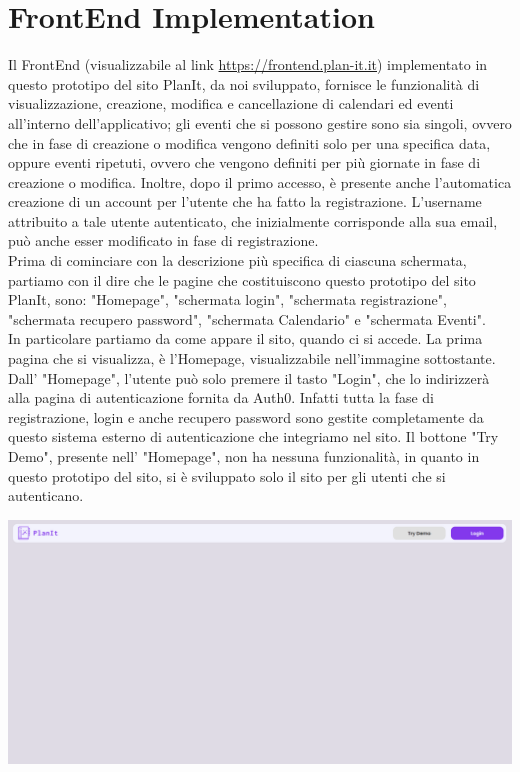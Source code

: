 \section{FrontEnd Implementation}
\label{secD4:FrontEndImplementation}
Il FrontEnd (visualizzabile al link \href{https://frontend.plan-it.it} {https://frontend.plan-it.it}) implementato in questo prototipo del sito PlanIt, da noi sviluppato, fornisce le funzionalità di visualizzazione, creazione, modifica e cancellazione di calendari ed eventi all'interno dell'applicativo; gli eventi che si possono gestire sono sia singoli, ovvero che in fase di creazione o modifica vengono definiti solo per una specifica data, oppure eventi ripetuti, ovvero che vengono definiti per più giornate in fase di creazione o modifica. Inoltre, dopo il primo accesso, è presente anche l'automatica creazione di un account per l'utente che ha fatto la registrazione. L'username attribuito a tale utente autenticato, che inizialmente corrisponde alla sua email, può anche esser modificato in fase di registrazione. \\ Prima di cominciare con la descrizione più specifica di ciascuna schermata, partiamo con il dire che le pagine che costituiscono questo prototipo del sito PlanIt, sono: "Homepage", "schermata login", "schermata registrazione", "schermata recupero password", "schermata Calendario" e "schermata Eventi".
\\ In particolare partiamo da come appare il sito, quando ci si accede. La prima pagina che si visualizza, è l'Homepage, visualizzabile nell'immagine sottostante. Dall' "Homepage", l'utente può solo premere il tasto "Login", che lo indirizzerà alla pagina di autenticazione fornita da Auth0. Infatti tutta la fase di registrazione, login e anche recupero password sono gestite completamente da questo sistema esterno di autenticazione che integriamo nel sito. Il bottone "Try Demo", presente nell' "Homepage", non ha nessuna funzionalità, in quanto in questo prototipo del sito, si è sviluppato solo il sito per gli utenti che si autenticano.
\begin{center}
    \includegraphics[width=1\textwidth, height=0.3\textheight]{img/png/FrontEnd/Homepage_Autenticazione/Homepage.png}
\end{center}
